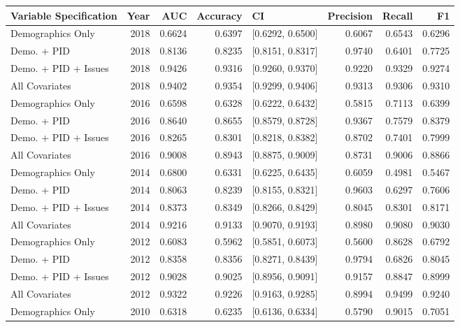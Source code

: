 \begin{table}[ht]
\centering
\begin{tabular}{lrrrlrrr}
  \toprule
Variable Specification & Year & AUC & Accuracy & CI & Precision & Recall & F1 \\ 
  \midrule
Demographics Only & 2018 & 0.6624 & 0.6397 & [0.6292, 0.6500] & 0.6067 & 0.6543 & 0.6296 \\ 
  Demo. + PID & 2018 & 0.8136 & 0.8235 & [0.8151, 0.8317] & 0.9740 & 0.6401 & 0.7725 \\ 
  Demo. + PID + Issues & 2018 & 0.9426 & 0.9316 & [0.9260, 0.9370] & 0.9220 & 0.9329 & 0.9274 \\ 
  All Covariates & 2018 & 0.9402 & 0.9354 & [0.9299, 0.9406] & 0.9313 & 0.9306 & 0.9310 \\ 
  Demographics Only & 2016 & 0.6598 & 0.6328 & [0.6222, 0.6432] & 0.5815 & 0.7113 & 0.6399 \\ 
  Demo. + PID & 2016 & 0.8640 & 0.8655 & [0.8579, 0.8728] & 0.9367 & 0.7579 & 0.8379 \\ 
  Demo. + PID + Issues & 2016 & 0.8265 & 0.8301 & [0.8218, 0.8382] & 0.8702 & 0.7401 & 0.7999 \\ 
  All Covariates & 2016 & 0.9008 & 0.8943 & [0.8875, 0.9009] & 0.8731 & 0.9006 & 0.8866 \\ 
  Demographics Only & 2014 & 0.6800 & 0.6331 & [0.6225, 0.6435] & 0.6059 & 0.4981 & 0.5467 \\ 
  Demo. + PID & 2014 & 0.8063 & 0.8239 & [0.8155, 0.8321] & 0.9603 & 0.6297 & 0.7606 \\ 
  Demo. + PID + Issues & 2014 & 0.8373 & 0.8349 & [0.8266, 0.8429] & 0.8045 & 0.8301 & 0.8171 \\ 
  All Covariates & 2014 & 0.9216 & 0.9133 & [0.9070, 0.9193] & 0.8980 & 0.9080 & 0.9030 \\ 
  Demographics Only & 2012 & 0.6083 & 0.5962 & [0.5851, 0.6073] & 0.5600 & 0.8628 & 0.6792 \\ 
  Demo. + PID & 2012 & 0.8358 & 0.8356 & [0.8271, 0.8439] & 0.9794 & 0.6826 & 0.8045 \\ 
  Demo. + PID + Issues & 2012 & 0.9028 & 0.9025 & [0.8956, 0.9091] & 0.9157 & 0.8847 & 0.8999 \\ 
  All Covariates & 2012 & 0.9322 & 0.9226 & [0.9163, 0.9285] & 0.8994 & 0.9499 & 0.9240 \\ 
  Demographics Only & 2010 & 0.6318 & 0.6235 & [0.6136, 0.6334] & 0.5790 & 0.9015 & 0.7051 \\ 

\end{tabular}
\end{table}
